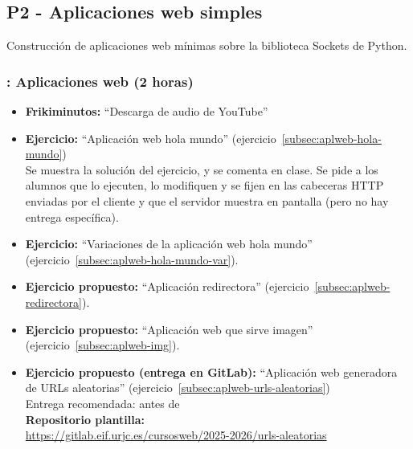 \documentclass[a4paper,12pt]{article}
\begin{document}
\subsection{P2 - Aplicaciones web simples}


Construcción de aplicaciones web mínimas sobre la biblioteca Sockets de Python.


\subsubsection{\juevesD: Aplicaciones web (2 horas)}
\label{cal:juevesD}

\begin{itemize}
\item \textbf{Frikiminutos:} ``Descarga de audio de YouTube''
\item \textbf{Ejercicio:} ``Aplicación web hola mundo'' (ejercicio~\ref{subsec:aplweb-hola-mundo}) \\
   Se muestra la solución del ejercicio, y se comenta en clase. Se pide a los alumnos que lo ejecuten, lo modifiquen y se fijen en las cabeceras HTTP enviadas por el cliente y que el servidor muestra en pantalla (pero no hay entrega específica).
 \item \textbf{Ejercicio:} ``Variaciones de la aplicación web hola mundo'' (ejercicio~\ref{subsec:aplweb-hola-mundo-var}).
 \item \textbf{Ejercicio propuesto:} ``Aplicación redirectora'' (ejercicio~\ref{subsec:aplweb-redirectora}).
 \item \textbf{Ejercicio propuesto:} ``Aplicación web que sirve imagen'' (ejercicio~\ref{subsec:aplweb-img}).

\item \textbf{Ejercicio propuesto (entrega en GitLab):} ``Aplicación web generadora de URLs aleatorias'' (ejercicio~\ref{subsec:aplweb-urls-aleatorias}) \\
  Entrega recomendada: antes de \juevesE \\
  \textbf{Repositorio plantilla:} \\
\url{https://gitlab.eif.urjc.es/cursosweb/2025-2026/urls-aleatorias}

\end{itemize}


\end{document}
